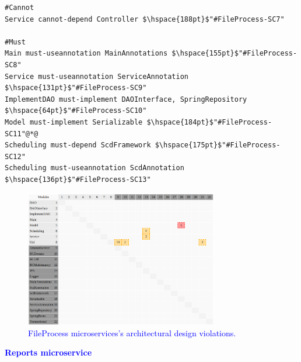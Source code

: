 \documentclass[12pt]{article}
\begin{document}
\begin{lstlisting}[style=colorido, caption={\textcolor{blue}{FileProcess microservice's architectural design specification.}},label={list:especArquiteturalFileProccess}
]
#Cannot
Service cannot-depend Controller $\hspace{188pt}$"#FileProcess-SC7"
    
#Must
Main must-useannotation MainAnnotations	$\hspace{155pt}$"#FileProcess-SC8"
Service must-useannotation ServiceAnnotation $\hspace{131pt}$"#FileProcess-SC9"
ImplementDAO must-implement DAOInterface, SpringRepository $\hspace{64pt}$"#FileProcess-SC10"
Model must-implement Serializable $\hspace{184pt}$"#FileProcess-SC11"@*@
Scheduling must-depend ScdFramework $\hspace{175pt}$"#FileProcess-SC12"
Scheduling must-useannotation ScdAnnotation $\hspace{136pt}$"#FileProcess-SC13"
\end{lstlisting}

\begin{figure}[ht]
\centering
\includegraphics[width=0.75\textwidth]{figuras/violacoesFileProccess.png}
\caption{\textcolor{blue}{FileProcess microservices's architectural design violations.}}
\label{fig:microservices}
\end{figure}


\noindent\textbf{\large{\textcolor{blue}{Reports microservice}}}
\label{sec:ApendiceReports}
\end{document}
